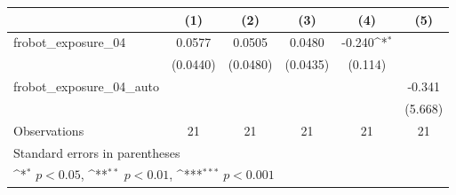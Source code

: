 {
\def\sym#1{\ifmmode^{#1}\else\(^{#1}\)\fi}
\begin{tabular}{l*{5}{c}}
\toprule
                    &\multicolumn{1}{c}{(1)}         &\multicolumn{1}{c}{(2)}         &\multicolumn{1}{c}{(3)}         &\multicolumn{1}{c}{(4)}         &\multicolumn{1}{c}{(5)}         \\
\midrule
frobot\_exposure\_04  &      0.0577         &      0.0505         &      0.0480         &      -0.240\sym{*}  &                     \\
                    &    (0.0440)         &    (0.0480)         &    (0.0435)         &     (0.114)         &                     \\
\addlinespace
frobot\_exposure\_04\_auto&                     &                     &                     &                     &      -0.341         \\
                    &                     &                     &                     &                     &     (5.668)         \\
\midrule
Observations        &          21         &          21         &          21         &          21         &          21         \\
\bottomrule
\multicolumn{6}{l}{\footnotesize Standard errors in parentheses}\\
\multicolumn{6}{l}{\footnotesize \sym{*} \(p<0.05\), \sym{**} \(p<0.01\), \sym{***} \(p<0.001\)}\\
\end{tabular}
}
